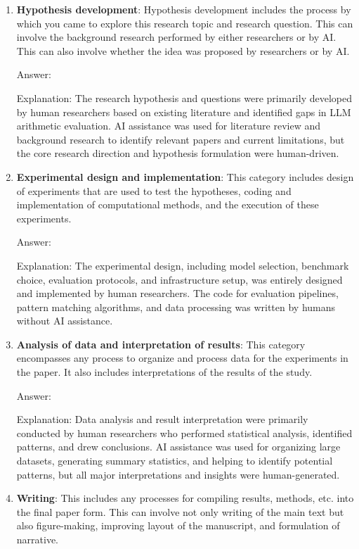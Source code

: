 \documentclass{article}
\begin{document}
\begin{enumerate}
    \item \textbf{Hypothesis development}: Hypothesis development includes the process by which you came to explore this research topic and research question. This can involve the background research performed by either researchers or by AI. This can also involve whether the idea was proposed by researchers or by AI.

    Answer: \involvementB{} %

    Explanation: The research hypothesis and questions were primarily developed by human researchers based on existing literature and identified gaps in LLM arithmetic evaluation. AI assistance was used for literature review and background research to identify relevant papers and current limitations, but the core research direction and hypothesis formulation were human-driven.

    \item \textbf{Experimental design and implementation}: This category includes design of experiments that are used to test the hypotheses, coding and implementation of computational methods, and the execution of these experiments.

    Answer: \involvementA{} %

    Explanation: The experimental design, including model selection, benchmark choice, evaluation protocols, and infrastructure setup, was entirely designed and implemented by human researchers. The code for evaluation pipelines, pattern matching algorithms, and data processing was written by humans without AI assistance.

    \item \textbf{Analysis of data and interpretation of results}: This category encompasses any process to organize and process data for the experiments in the paper. It also includes interpretations of the results of the study.

    Answer: \involvementB{} %

    Explanation: Data analysis and result interpretation were primarily conducted by human researchers who performed statistical analysis, identified patterns, and drew conclusions. AI assistance was used for organizing large datasets, generating summary statistics, and helping to identify potential patterns, but all major interpretations and insights were human-generated.

    \item \textbf{Writing}: This includes any processes for compiling results, methods, etc. into the final paper form. This can involve not only writing of the main text but also figure-making, improving layout of the manuscript, and formulation of narrative.


\end{enumerate}
\end{document}
